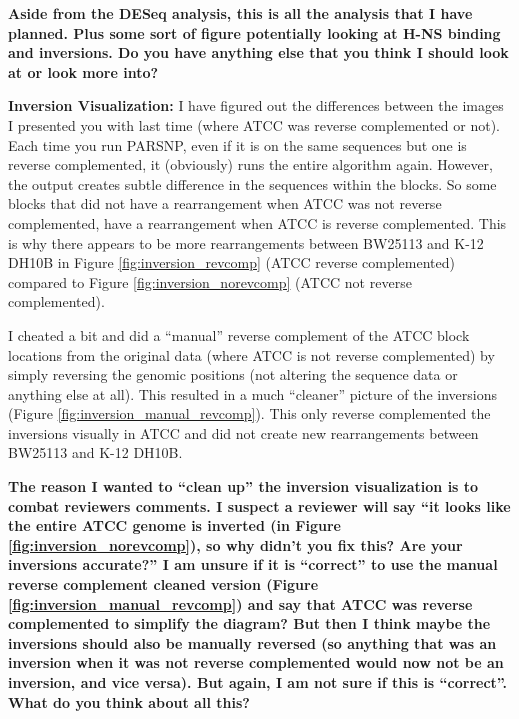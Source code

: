 \documentclass[12pt]{article}
\begin{document}
\textbf{Aside from the DESeq analysis, this is all the analysis that I have planned. Plus some sort of figure potentially looking at H-NS binding and inversions. Do you have anything else that you think I should look at or look more into?}


\textbf{Inversion Visualization:}
I have figured out the differences between the images I presented you with last time (where ATCC was reverse complemented or not).
Each time you run PARSNP, even if it is on the same sequences but one is reverse complemented, it (obviously) runs the entire algorithm again.
However, the output creates subtle difference in the sequences within the blocks.
So some blocks that did not have a rearrangement when ATCC was not reverse complemented, have a rearrangement when ATCC is reverse complemented.
This is why there appears to be more rearrangements between BW25113 and K-12 DH10B in Figure \ref{fig:inversion_revcomp} (ATCC reverse complemented) compared to Figure \ref{fig:inversion_norevcomp} (ATCC not reverse complemented).

I cheated a bit and did a ``manual'' reverse complement of the ATCC block locations from the original data (where ATCC is not reverse complemented) by simply reversing the genomic positions (not altering the sequence data or anything else at all).
This resulted in a much ``cleaner'' picture of the inversions (Figure \ref{fig:inversion_manual_revcomp}).
This only reverse complemented the inversions visually in ATCC and did not create new rearrangements between BW25113 and K-12 DH10B.

\textbf{The reason I wanted to ``clean up'' the inversion visualization is to combat reviewers comments. I suspect a reviewer will say ``it looks like the entire ATCC genome is inverted (in Figure \ref{fig:inversion_norevcomp}), so why didn't you fix this? Are your inversions accurate?'' I am unsure if it is ``correct'' to use the manual reverse complement cleaned version (Figure \ref{fig:inversion_manual_revcomp}) and say that ATCC was reverse complemented to simplify the diagram? But then I think maybe the inversions should also be manually reversed (so anything that was an inversion when it was not reverse complemented would now not be an inversion, and vice versa). But again, I am not sure if this is ``correct''. What do you think about all this?}
\end{document}
